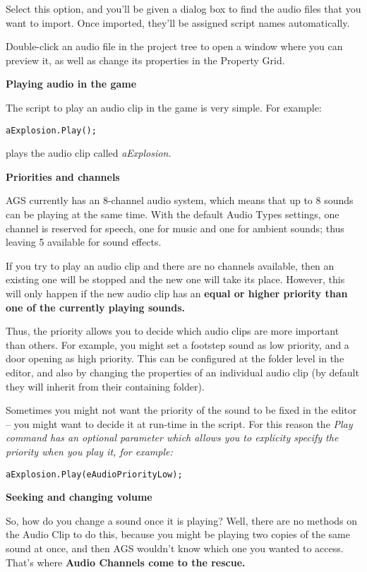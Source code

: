Select this option, and you'll be given a dialog box to find the audio files that you
want to import. Once imported, they'll be assigned script names automatically.

Double-click an audio file in the project tree to open a window where you can preview
it, as well as change its properties in the Property Grid.

\bf{Playing audio in the game}

The script to play an audio clip in the game is very simple. For example:
\begin{verbatim}
aExplosion.Play();
\end{verbatim}
plays the audio clip called \it{aExplosion}.

\bf{Priorities and channels}

AGS currently has an 8-channel audio system, which means that up to 8 sounds can be
playing at the same time. With the default Audio Types settings, one channel is reserved
for speech, one for music and one for ambient sounds; thus leaving 5 available for
sound effects.

If you try to play an audio clip and there are no channels available, then an existing
one will be stopped and the new one will take its place. However, this will only
happen if the new audio clip has an \bf{equal or higher} priority than one of the currently
playing sounds.

Thus, the priority allows you to decide which audio clips are more important than others.
For example, you might set a footstep sound as low priority, and a door opening as
high priority. This can be configured at the folder level in the editor, and also by
changing the properties of an individual audio clip (by default they will inherit from
their containing folder).

Sometimes you might not want the priority of the sound to be fixed in the editor -- you
might want to decide it at run-time in the script. For this reason the \it{Play} command
has an optional parameter which allows you to explicity specify the priority when you
play it, for example:
\begin{verbatim}
aExplosion.Play(eAudioPriorityLow);
\end{verbatim}

\bf{Seeking and changing volume}

So, how do you change a sound once it is playing? Well, there are no methods on the
Audio Clip to do this, because you might be playing two copies of the same sound at
once, and then AGS wouldn't know which one you wanted to access. That's where \bf{Audio
Channels} come to the rescue.

